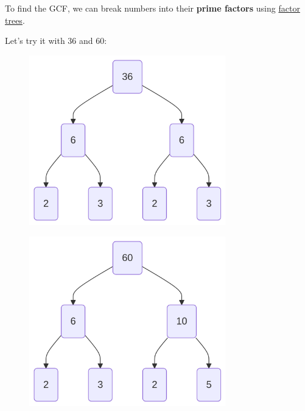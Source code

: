 \documentclass[
  letterpaper,
  DIV=11,
  numbers=noendperiod]{scrreprt}
\begin{document}
To find the GCF, we can break numbers into their \textbf{prime factors}
using \href{./glossary.html\#glossary-factor-tree}{factor trees}.

Let's try it with 36 and 60:

\begin{figure}

\begin{minipage}{0.50\linewidth}

\label{mermaid-diagram}
\includegraphics[width=3.35in,height=2.9in]{chapters/Unit_1/1.3_GCF_&_Simplifying_Fractions_files/figure-latex/mermaid-figure-6.png}

\end{minipage}%
%
\begin{minipage}{0.50\linewidth}

\label{mermaid-diagram}
\includegraphics[width=3.35in,height=2.9in]{chapters/Unit_1/1.3_GCF_&_Simplifying_Fractions_files/figure-latex/mermaid-figure-21.png}

\end{minipage}%

\end{figure}%
\end{document}
